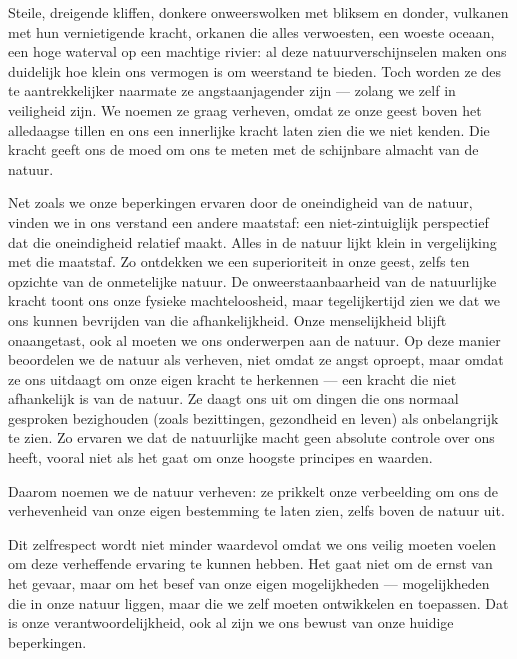 \begin{mdframed}[leftmargin=0pt,rightmargin=0pt,backgroundcolor=blue!6,linecolor=white,innertopmargin=6pt,innerbottommargin=6pt]
Steile, dreigende kliffen, donkere onweerswolken met bliksem en donder, vulkanen met hun vernietigende kracht, orkanen die alles verwoesten, een woeste oceaan, een hoge waterval op een machtige rivier: al deze natuurverschijnselen maken ons duidelijk hoe klein ons vermogen is om weerstand te bieden. Toch worden ze des te aantrekkelijker naarmate ze angstaanjagender zijn — zolang we zelf in veiligheid zijn. We noemen ze graag verheven, omdat ze onze geest boven het alledaagse tillen en ons een innerlijke kracht laten zien die we niet kenden. Die kracht geeft ons de moed om ons te meten met de schijnbare almacht van de natuur.

Net zoals we onze beperkingen ervaren door de oneindigheid van de natuur, vinden we in ons verstand een andere maatstaf: een niet-zintuiglijk perspectief dat die oneindigheid relatief maakt. Alles in de natuur lijkt klein in vergelijking met die maatstaf. Zo ontdekken we een superioriteit in onze geest, zelfs ten opzichte van de onmetelijke natuur. De onweerstaanbaarheid van de natuurlijke kracht toont ons onze fysieke machteloosheid, maar tegelijkertijd zien we dat we ons kunnen bevrijden van die afhankelijkheid. Onze menselijkheid blijft onaangetast, ook al moeten we ons onderwerpen aan de natuur. Op deze manier beoordelen we de natuur als verheven, niet omdat ze angst oproept, maar omdat ze ons uitdaagt om onze eigen kracht te herkennen — een kracht die niet afhankelijk is van de natuur. Ze daagt ons uit om dingen die ons normaal gesproken bezighouden (zoals bezittingen, gezondheid en leven) als onbelangrijk te zien. Zo ervaren we dat de natuurlijke macht geen absolute controle over ons heeft, vooral niet als het gaat om onze hoogste principes en waarden.

Daarom noemen we de natuur verheven: ze prikkelt onze verbeelding om ons de verhevenheid van onze eigen bestemming te laten zien, zelfs boven de natuur uit.

Dit zelfrespect wordt niet minder waardevol omdat we ons veilig moeten voelen om deze verheffende ervaring te kunnen hebben. Het gaat niet om de ernst van het gevaar, maar om het besef van onze eigen mogelijkheden — mogelijkheden die in onze natuur liggen, maar die we zelf moeten ontwikkelen en toepassen. Dat is onze verantwoordelijkheid, ook al zijn we ons bewust van onze huidige beperkingen.


\end{mdframed}
